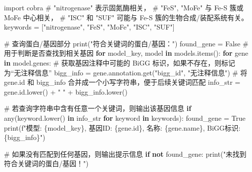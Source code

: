 \documentclass[
  letterpaper,
  DIV=11,
  numbers=noendperiod]{scrartcl}
\newenvironment{Shaded}{\begin{snugshade}}{\end{snugshade}}
\newcommand{\BuiltInTok}[1]{\textcolor[rgb]{0.00,0.23,0.31}{#1}}
\newcommand{\CommentTok}[1]{\textcolor[rgb]{0.37,0.37,0.37}{#1}}
\newcommand{\ControlFlowTok}[1]{\textcolor[rgb]{0.00,0.23,0.31}{\textbf{#1}}}
\newcommand{\ImportTok}[1]{\textcolor[rgb]{0.00,0.46,0.62}{#1}}
\newcommand{\KeywordTok}[1]{\textcolor[rgb]{0.00,0.23,0.31}{\textbf{#1}}}
\newcommand{\NormalTok}[1]{\textcolor[rgb]{0.00,0.23,0.31}{#1}}
\newcommand{\OperatorTok}[1]{\textcolor[rgb]{0.37,0.37,0.37}{#1}}
\newcommand{\SpecialCharTok}[1]{\textcolor[rgb]{0.37,0.37,0.37}{#1}}
\newcommand{\SpecialStringTok}[1]{\textcolor[rgb]{0.13,0.47,0.30}{#1}}
\newcommand{\StringTok}[1]{\textcolor[rgb]{0.13,0.47,0.30}{#1}}
\newcommand{\VariableTok}[1]{\textcolor[rgb]{0.07,0.07,0.07}{#1}}
\begin{document}
\begin{Shaded}
\begin{Highlighting}[]
\ImportTok{import}\NormalTok{ cobra}
\CommentTok{\# "nitrogenase" 表示固氮酶相关，}
\CommentTok{\# "FeS", "MoFe" 与 Fe{-}S 簇或 MoFe 中心相关，}
\CommentTok{\# "ISC" 和 "SUF" 可能与 Fe{-}S 簇的生物合成/装配系统有关。}
\NormalTok{keywords }\OperatorTok{=}\NormalTok{ [}\StringTok{"nitrogenase"}\NormalTok{, }\StringTok{"FeS"}\NormalTok{, }\StringTok{"MoFe"}\NormalTok{, }\StringTok{"ISC"}\NormalTok{, }\StringTok{"SUF"}\NormalTok{]}

\CommentTok{\# 查询蛋白/基因部分}
\BuiltInTok{print}\NormalTok{(}\StringTok{"符合关键词的蛋白/基因："}\NormalTok{)}
\NormalTok{found\_gene }\OperatorTok{=} \VariableTok{False}  \CommentTok{\# 用于判断是否查找到相关基因}
\ControlFlowTok{for}\NormalTok{ model\_key, model }\KeywordTok{in}\NormalTok{ models.items():}
    \ControlFlowTok{for}\NormalTok{ gene }\KeywordTok{in}\NormalTok{ model.genes:}
        \CommentTok{\# 获取基因注释中可能的 BiGG 标识，如果不存在，则标记为“无注释信息”}
\NormalTok{        bigg\_info }\OperatorTok{=}\NormalTok{ gene.annotation.get(}\StringTok{"bigg\_id"}\NormalTok{, }\StringTok{"无注释信息"}\NormalTok{)}
        \CommentTok{\# 将 gene.id 和 bigg\_info 合并成一个小写字符串，便于后续关键词匹配}
\NormalTok{        info\_str }\OperatorTok{=}\NormalTok{ gene.}\BuiltInTok{id}\NormalTok{.lower() }\OperatorTok{+} \StringTok{" "} \OperatorTok{+}\NormalTok{ bigg\_info.lower()}
        
        \CommentTok{\# 若查询字符串中含有任意一个关键词，则输出该基因信息}
        \ControlFlowTok{if} \BuiltInTok{any}\NormalTok{(keyword.lower() }\KeywordTok{in}\NormalTok{ info\_str }\ControlFlowTok{for}\NormalTok{ keyword }\KeywordTok{in}\NormalTok{ keywords):}
\NormalTok{            found\_gene }\OperatorTok{=} \VariableTok{True}
            \BuiltInTok{print}\NormalTok{(}\SpecialStringTok{f"模型: }\SpecialCharTok{\{}\NormalTok{model\_key}\SpecialCharTok{\}}\SpecialStringTok{, 基因ID: }\SpecialCharTok{\{}\NormalTok{gene}\SpecialCharTok{.}\BuiltInTok{id}\SpecialCharTok{\}}\SpecialStringTok{, 名称: }\SpecialCharTok{\{}\NormalTok{gene}\SpecialCharTok{.}\NormalTok{name}\SpecialCharTok{\}}\SpecialStringTok{, BiGG标识: }\SpecialCharTok{\{}\NormalTok{bigg\_info}\SpecialCharTok{\}}\SpecialStringTok{"}\NormalTok{)}

\CommentTok{\# 如果没有匹配到任何基因，则输出提示信息}
\ControlFlowTok{if} \KeywordTok{not}\NormalTok{ found\_gene:}
    \BuiltInTok{print}\NormalTok{(}\StringTok{"未找到符合关键词的蛋白/基因！"}\NormalTok{)}


\end{Highlighting}
\end{Shaded}
\end{document}
